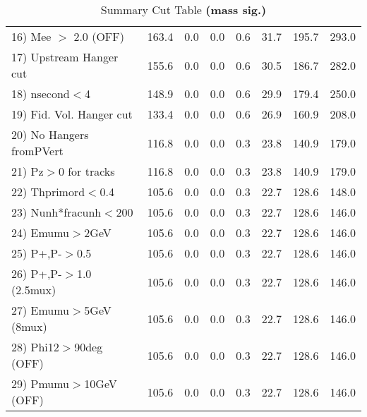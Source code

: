 \begin{table}[h!]
{{\begin{tabular}{||l||r|r|r|r|r||r||r||}
 16) Mee $>$ 2.0  (OFF)   &     163.4 &       0.0 &       0.0 &       0.6 &      31.7 &     195.7 &     293.0 \\
 17) Upstream Hanger cut  &     155.6 &       0.0 &       0.0 &       0.6 &      30.5 &     186.7 &     282.0 \\
 18) nsecond$<$4          &     148.9 &       0.0 &       0.0 &       0.6 &      29.9 &     179.4 &     250.0 \\
 19) Fid. Vol. Hanger cut &     133.4 &       0.0 &       0.0 &       0.6 &      26.9 &     160.9 &     208.0 \\
 20) No Hangers fromPVert &     116.8 &       0.0 &       0.0 &       0.3 &      23.8 &     140.9 &     179.0 \\
 21) Pz$>$0 for tracks    &     116.8 &       0.0 &       0.0 &       0.3 &      23.8 &     140.9 &     179.0 \\
 22) Thprimord$<$0.4      &     105.6 &       0.0 &       0.0 &       0.3 &      22.7 &     128.6 &     148.0 \\
 23) Nunh*fracunh$<$200   &     105.6 &       0.0 &       0.0 &       0.3 &      22.7 &     128.6 &     146.0 \\
 24) Emumu$>$2GeV         &     105.6 &       0.0 &       0.0 &       0.3 &      22.7 &     128.6 &     146.0 \\
 25) P+,P-$>$0.5          &     105.6 &       0.0 &       0.0 &       0.3 &      22.7 &     128.6 &     146.0 \\
 26) P+,P-$>$1.0 (2.5mux) &     105.6 &       0.0 &       0.0 &       0.3 &      22.7 &     128.6 &     146.0 \\
 27) Emumu$>$5GeV  (8mux) &     105.6 &       0.0 &       0.0 &       0.3 &      22.7 &     128.6 &     146.0 \\
 28) Phi12$>$90deg  (OFF) &     105.6 &       0.0 &       0.0 &       0.3 &      22.7 &     128.6 &     146.0 \\
 29) Pmumu$>$10GeV  (OFF) &     105.6 &       0.0 &       0.0 &       0.3 &      22.7 &     128.6 &     146.0 \\
 \hline
 \hline
 \end{tabular}
 \caption{Summary Cut Table \textbf{ (mass sig.) }}
 \label{tab-sumcut}
 }}
 \end{table}
 \endinput

